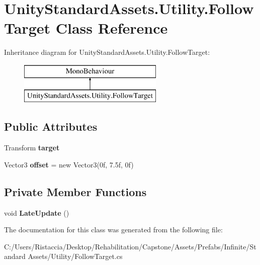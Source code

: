 \hypertarget{class_unity_standard_assets_1_1_utility_1_1_follow_target}{}\section{Unity\+Standard\+Assets.\+Utility.\+Follow\+Target Class Reference}
\label{class_unity_standard_assets_1_1_utility_1_1_follow_target}
Inheritance diagram for Unity\+Standard\+Assets.\+Utility.\+Follow\+Target\+:\begin{figure}[H]
\begin{center}
\leavevmode
\includegraphics[height=2.000000cm]{class_unity_standard_assets_1_1_utility_1_1_follow_target}
\end{center}
\end{figure}
\subsection*{Public Attributes}
\begin{DoxyCompactItemize}
\item 
\mbox{\label{class_unity_standard_assets_1_1_utility_1_1_follow_target_a4c2dbf9ba86180247a02197121179980}} 
Transform {\bfseries target}
\item 
\mbox{\label{class_unity_standard_assets_1_1_utility_1_1_follow_target_a03ad3cd844ff4d6c20f71e356b4d5388}} 
Vector3 {\bfseries offset} = new Vector3(0f, 7.\+5f, 0f)
\end{DoxyCompactItemize}
\subsection*{Private Member Functions}
\begin{DoxyCompactItemize}
\item 
\mbox{\label{class_unity_standard_assets_1_1_utility_1_1_follow_target_a7f7cee496fc618e74c1f54f1078c77b4}} 
void {\bfseries Late\+Update} ()
\end{DoxyCompactItemize}


The documentation for this class was generated from the following file\+:\begin{DoxyCompactItemize}
\item 
C\+:/\+Users/\+Ristaccia/\+Desktop/\+Rehabilitation/\+Capstone/\+Assets/\+Prefabs/\+Infinite/\+Standard Assets/\+Utility/Follow\+Target.\+cs\end{DoxyCompactItemize}

